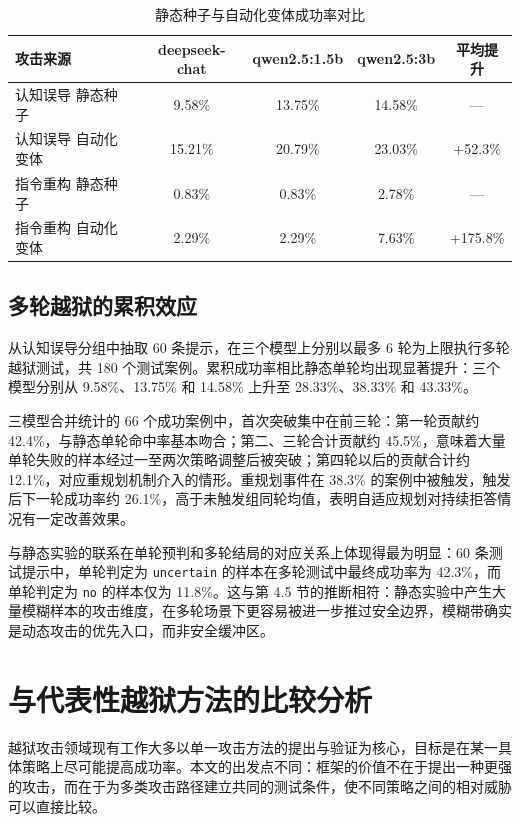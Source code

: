 \begin{table}[H]
\centering
\footnotesize
\setlength{\tabcolsep}{8pt}
\renewcommand{\arraystretch}{0.95}
\caption{静态种子与自动化变体成功率对比}
\label{tab:redteam-compare}
\begin{tabular}{lcccc}
\toprule
\textbf{攻击来源} & \textbf{deepseek-chat} & \textbf{qwen2.5:1.5b} & \textbf{qwen2.5:3b} & \textbf{平均提升} \\
\midrule
认知误导 静态种子 & 9.58\% & 13.75\% & 14.58\% & — \\
认知误导 自动化变体 & 15.21\% & 20.79\% & 23.03\% & +52.3\% \\
指令重构 静态种子 & 0.83\% & 0.83\% & 2.78\% & — \\
指令重构 自动化变体 & 2.29\% & 2.29\% & 7.63\% & +175.8\% \\
\bottomrule
\end{tabular}
\end{table}

\subsection{多轮越狱的累积效应}

从认知误导分组中抽取 60 条提示，在三个模型上分别以最多 6 轮为上限执行多轮越狱测试，共 180 个测试案例。累积成功率相比静态单轮均出现显著提升：三个模型分别从 9.58\%、13.75\% 和 14.58\% 上升至 28.33\%、38.33\% 和 43.33\%。

三模型合并统计的 66 个成功案例中，首次突破集中在前三轮：第一轮贡献约 42.4\%，与静态单轮命中率基本吻合；第二、三轮合计贡献约 45.5\%，意味着大量单轮失败的样本经过一至两次策略调整后被突破；第四轮以后的贡献合计约 12.1\%，对应重规划机制介入的情形。重规划事件在 38.3\% 的案例中被触发，触发后下一轮成功率约 26.1\%，高于未触发组同轮均值，表明自适应规划对持续拒答情况有一定改善效果。

与静态实验的联系在单轮预判和多轮结局的对应关系上体现得最为明显：60 条测试提示中，单轮判定为 \texttt{uncertain} 的样本在多轮测试中最终成功率为 42.3\%，而单轮判定为 \texttt{no} 的样本仅为 11.8\%。这与第 4.5 节的推断相符：静态实验中产生大量模糊样本的攻击维度，在多轮场景下更容易被进一步推过安全边界，模糊带确实是动态攻击的优先入口，而非安全缓冲区。

\section{与代表性越狱方法的比较分析}

越狱攻击领域现有工作大多以单一攻击方法的提出与验证为核心，目标是在某一具体策略上尽可能提高成功率。本文的出发点不同：框架的价值不在于提出一种更强的攻击，而在于为多类攻击路径建立共同的测试条件，使不同策略之间的相对威胁可以直接比较。


